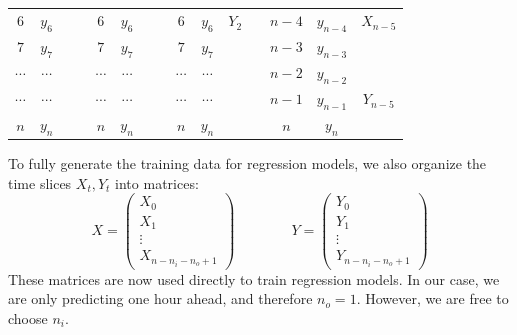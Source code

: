 \documentclass[11pt]{article}
\begin{document}
\begin{center}
\begin{tabular}{|c|c|cc|c|c|cc|c|c|cc|c|c|c}
    $6$        & $y_6$                         &                &  & $6$        & \cellcolor[HTML]{EB7D7D}$y_6$ &                &  & $6$        & \cellcolor[HTML]{EB7D7D}$y_6$ & $Y_2$ &  & ${n-4}$    & \cellcolor[HTML]{A2E4F6}$y_{n-4}$ & $X_{n-5}$ \\ \cline{1-2} \cline{5-6} \cline{9-10} \cline{13-14}
    $7$        & $y_7$                         &                &  & $7$        & $y_7$                         &                &  & $7$        & \cellcolor[HTML]{EB7D7D}$y_7$ &                &  & ${n-3}$    & \cellcolor[HTML]{A2E4F6}$y_{n-3}$ &                \\ \cline{1-2} \cline{5-6} \cline{9-10} \cline{13-14}
    $\cdots$            & $\cdots$                             &                &  & $\cdots$            & $\cdots$                             &                &  & $\cdots$            & $\cdots$                             &                &  & ${n-2}$    & \cellcolor[HTML]{A2E4F6}$y_{n-2}$ &       \\ \cline{1-2} \cline{5-6} \cline{9-10} \cline{13-14}
    $\cdots$            & $\cdots$                             &                &  & $\cdots$            & $\cdots$                             &                &  & $\cdots$            & $\cdots$                             &                &  & ${n-1}$    & \cellcolor[HTML]{EB7D7D}$y_{n-1}$ & $Y_{n-5}$ \\ \cline{1-2} \cline{5-6} \cline{9-10} \cline{13-14}
    $n$        & $y_n$                         &                &  & $n$        & $y_n$                         &                &  & $n$        & $y_n$                         &                &  & $n$        & \cellcolor[HTML]{EB7D7D}$y_n$     &                \\ \cline{1-2} \cline{5-6} \cline{9-10} \cline{13-14}
  \end{tabular}
\end{center}

To fully generate the training data for regression models, we also organize the time slices $X_t, Y_t$ into matrices:
\begin{equation*}
  X =
  \begin{pmatrix}
    X_0 \\
    X_1 \\
    \vdots \\
    X_{n-n_i-n_o+1}
  \end{pmatrix}
  \qquad \qquad
  Y =
  \begin{pmatrix}
    Y_0 \\
    Y_1 \\
    \vdots \\
    Y_{n-n_i-n_o+1}
  \end{pmatrix}
\end{equation*}
These matrices are now used directly to train regression models.
In our case, we are only predicting one hour ahead, and therefore $n_o = 1$.
However, we are free to choose $n_i$.
\end{document}
